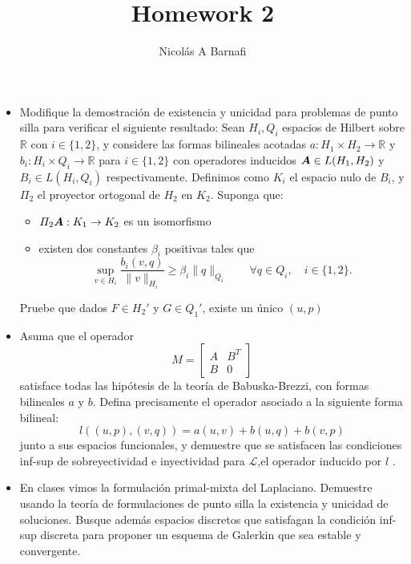 \documentclass{article}
\title{Homework 2}
\author{Nicol\'as A Barnafi}
\newcommand{\mat}{\matrixsym}
\newcommand{\R}{\mathbb{R}}
\begin{document}
\maketitle

\begin{itemize}
    \item Modifique la demostración de existencia y unicidad para problemas de punto silla para verificar el siguiente resultado: Sean $H_i, Q_i$ espacios de Hilbert sobre $\R$ con $i\in\{1,2\}$, y considere las formas bilineales acotadas $a:H_1\times H_2\to \R$ y $b_i:H_i\times Q_i\to \R$ para $i\in\{1,2\}$ con operadores inducidos $\mat A\in L(H_1, H_2)$ y $B_i\in L(H_i,Q_i)$ respectivamente. Definimos como $K_i$ el espacio nulo de $B_i$, y $\Pi_2$ el proyector ortogonal de $H_2$ en $K_2$. Suponga que:
        \begin{itemize}
            \item $\Pi_2\mat A:K_1\to K_2$ es un isomorfismo
            \item existen dos constantes $\beta_i$ positivas tales que
                $$ \sup_{v\in H_i} \frac{b_i(v,q)}{\|v\|_{H_i}} \geq \beta_i \| q \|_{Q_i} \qquad \forall q \in Q_i, \quad i \in \{1,2\}. $$
        \end{itemize}
        Pruebe que dados $F\in H_2'$ y $G\in Q_1'$, existe un único $(u,p)$
    \item Asuma que el operador
        $$ M = \begin{bmatrix} A & B^T \\ B & 0 \end{bmatrix} $$
            satisface todas las hipótesis de la teoría de Babuska-Brezzi, con formas bilineales $a$ y $b$. Defina precisamente el operador asociado a la siguiente forma bilineal:
            $$ l( (u,p), (v,q)) = a(u,v) + b(u,q) + b(v,p) $$
            junto a sus espacios funcionales, y demuestre que se satisfacen las condiciones inf-sup de sobreyectividad e inyectividad para $\mathcal L$,el operador inducido por $l$ .
    \item En clases vimos la formulación primal-mixta del Laplaciano. Demuestre usando la teoría de formulaciones de punto silla la existencia y unicidad de soluciones. Busque además espacios discretos que satisfagan la condición inf-sup discreta para proponer un esquema de Galerkin que sea estable y convergente.


\end{itemize}
\end{document}
